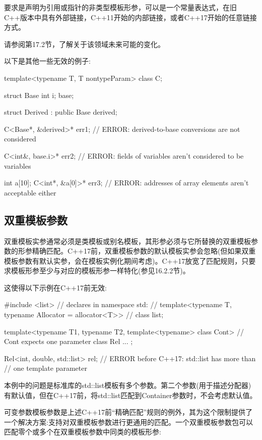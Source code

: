 要求是声明为引用或指针的非类型模板形参，可以是一个常量表达式，在旧C++版本中具有外部链接，C++11开始的内部链接，或者C++17开始的任意链接方式。

请参阅第17.2节，了解关于该领域未来可能的变化。

以下是其他一些无效的例子:

\begin{cpp}
template<typename T, T nontypeParam>
class C;

struct Base {
	int i;
} base;

struct Derived : public Base {
} derived;

C<Base*, &derived>* err1; // ERROR: derived-to-base conversions are not considered

C<int&, base.i>* err2; // ERROR: fields of variables aren't considered to be variables

int a[10];
C<int*, &a[0]>* err3; // ERROR: addresses of array elements aren't acceptable either
\end{cpp}


\subsection{双重模板参数}

双重模板实参通常必须是类模板或别名模板，其形参必须与它所替换的双重模板参数的形参精确匹配。C++17前，双重模板参数的默认模板实参会忽略(但如果双重模板参数有默认实参，会在模板实例化期间考虑)。C++17放宽了匹配规则，只要求模板形参至少与对应的模板形参一样特化(参见16.2.2节)。

这使得以下示例在C++17前无效:

\begin{cpp}
#include <list>
	// declares in namespace std:
	// template<typename T, typename Allocator = allocator<T>>
	// class list;

template<typename T1, typename T2,
		template<typename> class Cont> // Cont expects one parameter
class Rel {
	...
};

Rel<int, double, std::list> rel; // ERROR before C++17: std::list has more than
								// one template parameter
\end{cpp}

本例中的问题是标准库的std::list模板有多个参数。第二个参数(用于描述分配器)有默认值，但在C++17前，将std::list匹配到Container参数时，不会考虑默认值。

可变参数模板参数是上述C++17前“精确匹配”规则的例外，其为这个限制提供了一个解决方案:支持对双重模板参数进行更通用的匹配。一个双重模板参数包可以匹配零个或多个在双重模板参数中同类的模板形参:

